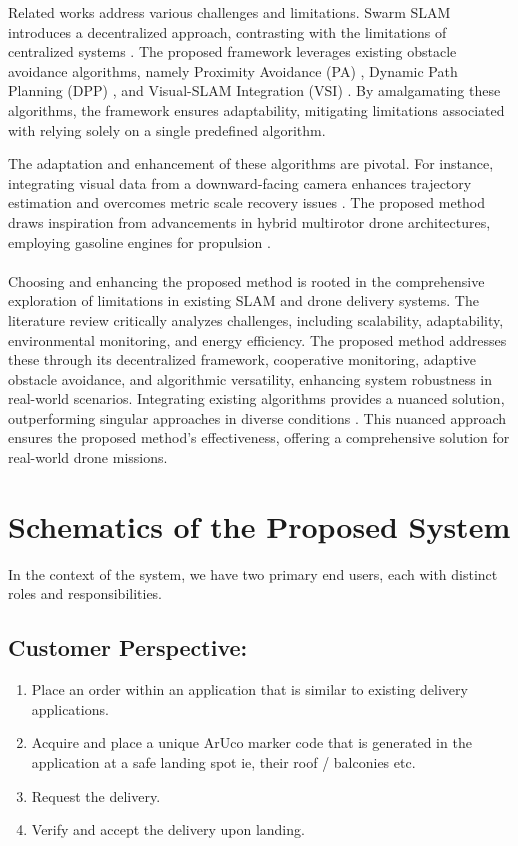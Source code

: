 \documentclass[preprint,12pt]{elsarticle}
\begin{document}
Related works address various challenges and limitations. Swarm SLAM introduces a decentralized approach, contrasting with the limitations of centralized systems \cite{kegeleirs2021swarm}. The proposed framework leverages existing obstacle avoidance algorithms, namely Proximity Avoidance (PA) \cite{munguía2016vslam}, Dynamic Path Planning (DPP) \cite{lópez2017sensorial}, and Visual-SLAM Integration (VSI) \cite{gupta2022slam}. By amalgamating these algorithms, the framework ensures adaptability, mitigating limitations associated with relying solely on a single predefined algorithm.

The adaptation and enhancement of these algorithms are pivotal. For instance, integrating visual data from a downward-facing camera enhances trajectory estimation and overcomes metric scale recovery issues \cite{chen2022end}. The proposed method draws inspiration from advancements in hybrid multirotor drone architectures, employing gasoline engines for propulsion \cite{jarrah2022flight}.\\\\

Choosing and enhancing the proposed method is rooted in the comprehensive exploration of limitations in existing SLAM and drone delivery systems. The literature review critically analyzes challenges, including scalability, adaptability, environmental monitoring, and energy efficiency. The proposed method addresses these through its decentralized framework, cooperative monitoring, adaptive obstacle avoidance, and algorithmic versatility, enhancing system robustness in real-world scenarios. Integrating existing algorithms provides a nuanced solution, outperforming singular approaches in diverse conditions \cite{stolaroff2018energy, arshad2021loop, chen2022coverage}. This nuanced approach ensures the proposed method's effectiveness, offering a comprehensive solution for real-world drone missions.

\section{Schematics of the Proposed System}
In the context of the system, we have two primary end users, each with distinct roles and responsibilities. 

\subsection{Customer Perspective:}
\begin{enumerate}
\item Place an order within an application that is similar to existing delivery applications.
\item Acquire and place a unique ArUco marker code that is generated in the application at a safe landing spot ie, their roof / balconies etc.
\item Request the delivery.
\item Verify and accept the delivery upon landing.
\end{enumerate}
\end{document}
